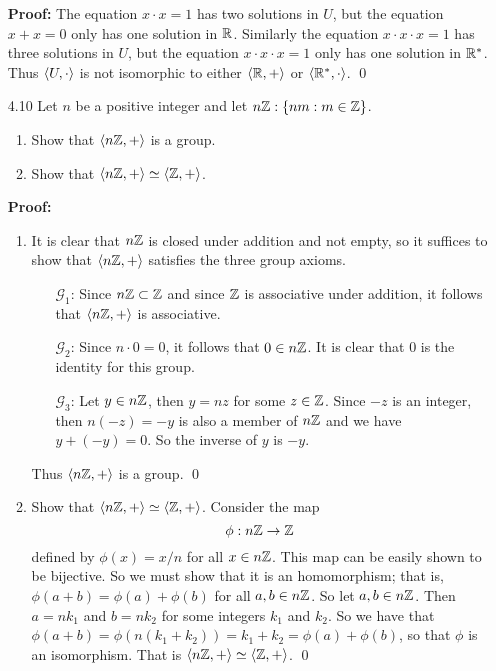 \begin{enumerate}
		\textbf{Proof:} The equation $x \cdot x = 1$ has two solutions in $U$, but
		the equation $x + x = 0$ only has one solution in $\mathbb{R}$. Similarly the
		equation $x \cdot x \cdot x = 1$ has three solutions in $U$, but the 
      equation	$x \cdot x \cdot x = 1$ only has one solution in $\mathbb{R}^*$. Thus
		$\langle U, \cdot \rangle$ is not isomorphic to either
		$\langle \mathbb{R}, + \rangle$ or $\langle \mathbb{R}^*, \cdot \rangle$. \qed
   \item[4.10] Let $n$ be a positive integer and let $n\mathbb{Z} : \{nm : m \in \mathbb{Z}\}$.
      \begin{enumerate}
         \item Show that $\langle n\mathbb{Z}, + \rangle$ is a group.
         \item Show that $\langle n\mathbb{Z}, + \rangle \simeq \langle \mathbb{Z}, + \rangle$.
      \end{enumerate}
		
		\textbf{Proof:}
		
		\begin{enumerate}
         \item It is clear that $n\mathbb{Z}$ is closed under addition and not empty, so
					it suffices to show that $\langle n\mathbb{Z}, + \rangle$ satisfies the three
					group axioms.
					\begin{enumerate}
						\item[$\mathscr{G}_1$:]	Since $n\mathbb{Z} \subset \mathbb{Z}$ and since $\mathbb{Z}$
														is associative under addition, it
														follows that $\langle n\mathbb{Z}, + \rangle$ is
														associative.
						\item[$\mathscr{G}_2$:]	Since $n \cdot 0 = 0$, it follows that
														$0 \in n\mathbb{Z}$. It is clear that 0 is the
														identity for this group.
						\item[$\mathscr{G}_3$:]	Let $y \in n\mathbb{Z}$, then $y = nz$ for
														some $z \in \mathbb{Z}$. Since $-z$ is an
														integer, then $n(-z) = -y$ is also a
														member of $n\mathbb{Z}$ and we have
														$y + (-y) = 0$. So the inverse of $y$
														is $-y$.
		         \end{enumerate}

               Thus $\langle n\mathbb{Z}, + \rangle$ is a group. \qed
         \item Show that $\langle n\mathbb{Z}, + \rangle \simeq \langle \mathbb{Z}, + \rangle$.
					Consider the map
					$$\phi : n\mathbb{Z} \rightarrow \mathbb{Z}$$
					defined by $\phi(x) = x/n$ for all $x \in n\mathbb{Z}$. This map can be
					easily shown to be bijective. So we must show that it is an
					homomorphism; that is, $\phi(a + b) = \phi(a) + \phi(b)$ for all
					$a, b \in n\mathbb{Z}$. So let $a, b \in n\mathbb{Z}$. Then $a = nk_1$ and
					$b = nk_2$ for some integers $k_1$ and $k_2$. So we have that
					$\phi(a + b) = \phi(n(k_1 + k_2)) = k_1 + k_2 =
					\phi(a) + \phi(b)$, so that $\phi$ is an isomorphism. That is
					$\langle n\mathbb{Z}, + \rangle \simeq \langle \mathbb{Z}, + \rangle$. \qed
      \end{enumerate}
\end{enumerate}

